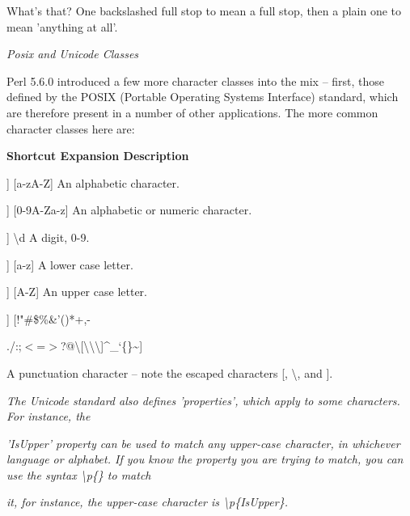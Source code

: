 \documentclass[a4paper,11pt]{book}
\begin{document}
\noindent 

\noindent 

\noindent What's that? One backslashed full stop to mean a full stop, then a plain one to mean 'anything at all'.

\noindent 

\noindent \textit{Posix and Unicode Classes}

\noindent Perl 5.6.0 introduced a few more character classes into the mix -- first, those defined by the POSIX (Portable Operating Systems Interface) standard, which are therefore present in a number of other applications. The more common character classes here are:

\noindent 

\noindent \textbf{Shortcut Expansion Description}

\noindent 

\noindent [[:alpha:]] [a-zA-Z] An alphabetic character.

\noindent 

\noindent [[:alnum:]] [0-9A-Za-z] An alphabetic or numeric character.

\noindent 

\noindent [[:digit:]] \textbackslash d A digit, 0-9.

\noindent 

\noindent [[:lower:]] [a-z] A lower case letter.

\noindent 

\noindent [[:upper:]] [A-Z] An upper case letter.

\noindent 

\noindent [[:punct:]] [!"\#\$\%\&'()*+,-

\noindent ./:;$<$=$>$?@\textbackslash [\textbackslash \textbackslash \textbackslash ]\^{}\_`\{\textbar \}\~{}]

\noindent 

\noindent A punctuation character -- note the escaped characters [, \textbackslash , and ].

\noindent 

\noindent 

\noindent \textit{The Unicode standard also defines 'properties', which apply to some characters. For instance, the}

\noindent \textit{'IsUpper' property can be used to match any upper-case character, in whichever language or alphabet. If you know the property you are trying to match, you can use the syntax \textbackslash p\{\} to match}

\noindent \textit{it, for instance, the upper-case character is \textbackslash p\{IsUpper\}.}
\end{document}
